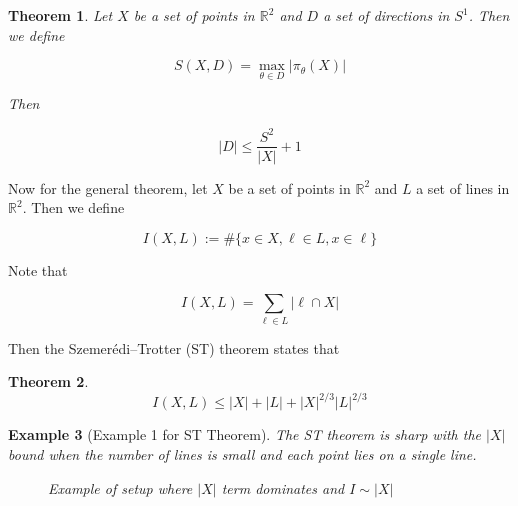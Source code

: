 \documentclass[12pt]{amsart}
\newtheorem{theorem}{Theorem}[section]
\newtheorem{example}[theorem]{Example}
\begin{document}
\begin{theorem}
    Let $X$ be a set of points in $\mathbb{R}^2$ and $D$ a set of directions in $S^1$. Then we define 

    \begin{equation}
    S(X,D) = \max_{\theta \in D} |\pi_\theta(X)|
    \end{equation}

    Then 

    \begin{equation}
    |D| \leq \frac{S^2}{|X|} + 1
    \end{equation}
\end{theorem}


Now for the general theorem, let $X$ be a set of points in $\mathbb{R}^2$ and $L$ a set of lines in $\mathbb{R}^2$. Then we define 

\[I(X,L) := \#\{ x\in X, \ell \in L, x \in \ell \} \]  

Note that 

\[I(X,L) = \sum_{\ell \in L} |\ell \cap X| \] 


Then the Szemerédi–Trotter (ST) theorem states that 

\begin{theorem}
    \begin{equation}
        I(X,L) \leq |X| + |L| + |X|^{2/3} |L|^{2/3}
    \end{equation}
\end{theorem}



\begin{example}[Example 1 for ST Theorem]
    


The ST theorem is sharp with the $|X|$ bound when the number of lines is small and each point lies on a single line.

\hspace{5cm}

\begin{figure}[h]
    \centering
{}
\caption{Example of setup where $|X|$ term dominates and $I \sim |X|$}
\label{fig:example1st}
\end{figure}
\end{example}
\end{document}
